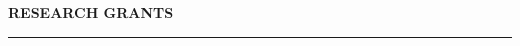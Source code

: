 \documentclass[10pt, a4paper]{article}
\begin{document}


\textbf{\uppercase{Research Grants}}\\
\rule[0.5ex]{\linewidth}{.5pt}\vspace{.25cm}
\end{document}
